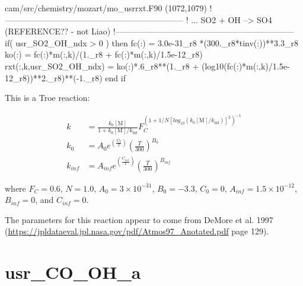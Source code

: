\documentclass[titlepage]{article}
\begin{document}
\begin{blockcode}[commandchars=\\\{\}]
\color{gray}cam/src/chemistry/mozart/mo_usrrxt.F90 (1072,1079)
!-----------------------------------------------------------------
!       ... SO2 + OH  --> SO4  (REFERENCE?? - not Liao)
!-----------------------------------------------------------------
       if( usr_SO2_OH_ndx > 0 ) then
          fc(:) = 3.0e-31_r8 *(300._r8*tinv(:))**3.3_r8
          ko(:) = fc(:)*m(:,k)/(1._r8 + fc(:)*m(:,k)/1.5e-12_r8)
          rxt(:,k,usr_SO2_OH_ndx) = ko(:)*.6_r8**(1._r8 + (log10(fc(:)*m(:,k)/1.5e-12_r8))**2._r8)**(-1._r8)
       end if
\end{blockcode}

This is a Troe reaction:

\begin{equation}
\begin{split}
k & = \frac{k_0[\mbox{M}]}{1+k_0[\mbox{M}]/k_{\inf}}F_C^{(1+1/N[log_{10}(k_0[\mbox{M}]/k_{\inf})]^2)^{-1}} \\
k_0 & = A_0 e^{\left( \frac{C_0}{T} \right)} \left( \frac{T}{300} \right)^{B_0} \\
k_{inf} & = A_{inf} e^{\left( \frac{C_{inf}}{T} \right)} \left( \frac{T}{300} \right)^{B_{inf}}
\end{split}
\end{equation}

\noindent where $F_C = 0.6$, $N = 1.0$, $A_0 = 3 \times 10^{-31}$, $B_0 = -3.3$, $C_0 = 0$, $A_{inf} = 1.5 \times 10^{-12}$, $B_{inf} = 0$, and $C_{inf} = 0$.

The parameters for this reaction appear to come from DeMore et al. 1997 (\url{https://jpldataeval.jpl.nasa.gov/pdf/Atmos97_Anotated.pdf} page 129).



\section{usr\_CO\_OH\_a}
\end{document}
